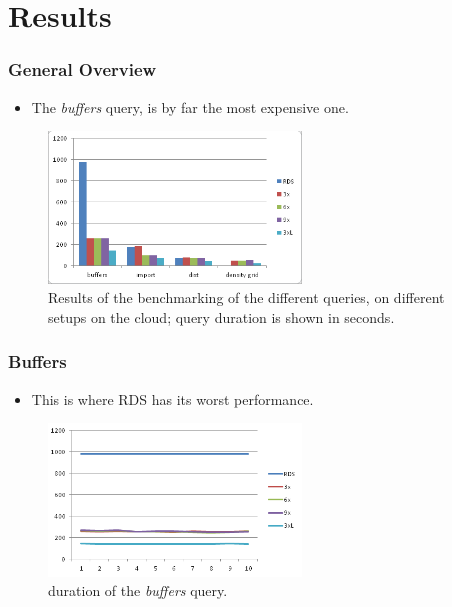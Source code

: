 \documentclass[hyperref={pdfpagelabels=true}]{beamer}
\begin{document}
\section{Results} 
\begin{frame}
\frametitle{General Overview}
  \begin{itemize}    
    \item<2->The \textit{buffers} query, is by far the most expensive one.
  \end{itemize} 
    \begin{figure}       
	\includegraphics[width=0.6\textwidth]{general1.png}      
	\caption{\tiny{Results of the benchmarking of the different queries, on different setups on the cloud; query duration is shown in seconds.}}
     \end{figure} 
\end{frame}

\begin{frame}
\frametitle{Buffers}
  \begin{itemize}    
    \item<2->This is where RDS has its worst performance.
  \end{itemize} 
    \begin{figure}       
	\includegraphics[width=0.6\textwidth]{buffers.png}      
	\caption{\tiny{duration of the \textit{buffers} query.}}
     \end{figure} 
\end{frame}
\end{document}
